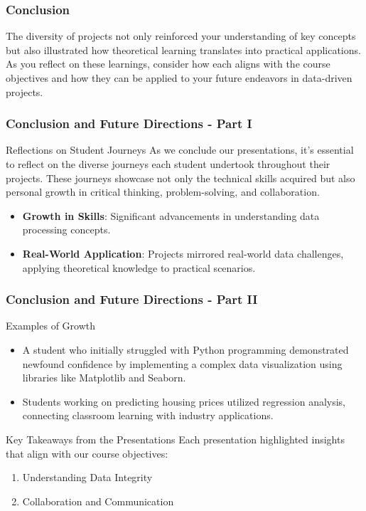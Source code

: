 \documentclass{beamer}
\begin{document}
\begin{frame}
    \frametitle{Conclusion}
    The diversity of projects not only reinforced your understanding of key concepts but also illustrated how theoretical learning translates into practical applications. As you reflect on these learnings, consider how each aligns with the course objectives and how they can be applied to your future endeavors in data-driven projects.
\end{frame}

\begin{frame}[fragile]
    \frametitle{Conclusion and Future Directions - Part I}
    \begin{block}{Reflections on Student Journeys}
        As we conclude our presentations, it’s essential to reflect on the diverse journeys each student undertook throughout their projects. These journeys showcase not only the technical skills acquired but also personal growth in critical thinking, problem-solving, and collaboration.
    \end{block}

    \begin{itemize}
        \item \textbf{Growth in Skills}: Significant advancements in understanding data processing concepts.
        \item \textbf{Real-World Application}: Projects mirrored real-world data challenges, applying theoretical knowledge to practical scenarios.
    \end{itemize}
\end{frame}

\begin{frame}[fragile]
    \frametitle{Conclusion and Future Directions - Part II}
    \begin{block}{Examples of Growth}
        \begin{itemize}
            \item A student who initially struggled with Python programming demonstrated newfound confidence by implementing a complex data visualization using libraries like Matplotlib and Seaborn.
            \item Students working on predicting housing prices utilized regression analysis, connecting classroom learning with industry applications.
        \end{itemize}
    \end{block}

    \begin{block}{Key Takeaways from the Presentations}
        Each presentation highlighted insights that align with our course objectives:
        \begin{enumerate}
            \item Understanding Data Integrity
            \item Collaboration and Communication
        \end{enumerate}
    \end{block}
\end{frame}
\end{document}

